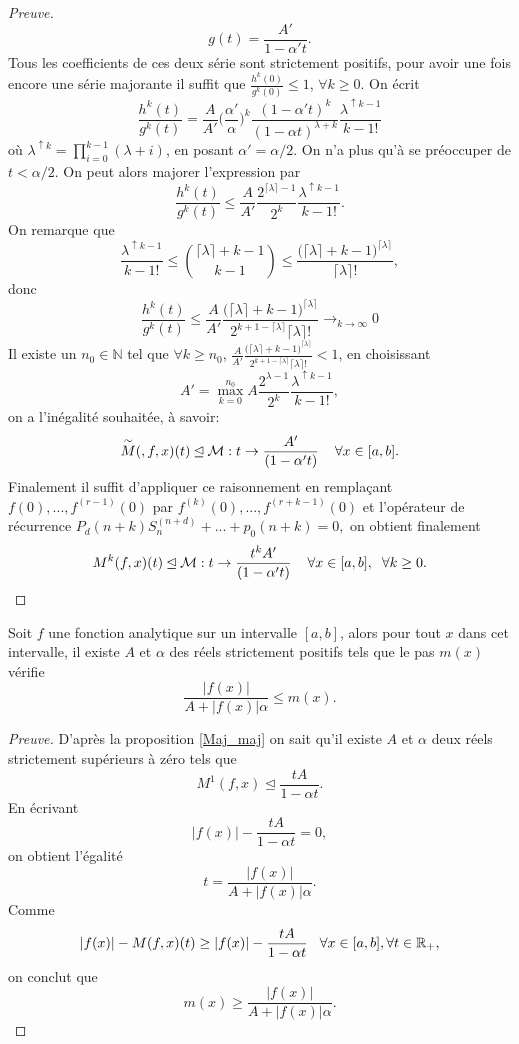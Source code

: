 \documentclass[a4paper,10pt]{article}
\begin{document}
\begin{proof}[Preuve]
		\[g(t)=\frac{A'}{1-\alpha' t}.\]
		Tous les coefficients de ces deux série sont strictement positifs, pour avoir une fois encore une série majorante il suffit que $\frac{h^{k}(0)}{g^k(0)}\leq 1$, $\forall k\geq0$. On écrit 
		\[\frac{h^{k}(t)}{g^k(t)}=\frac{A}{A'}\Big(\frac{\alpha'}{\alpha}\Big)^k\frac{(1-\alpha' t)^k}{(1-\alpha t)^{\lambda+k}}\frac{\lambda^{\uparrow k-1}}{k-1!}\]
		où $\lambda^{\uparrow k}=\prod_{i=0}^{k-1}(\lambda+i)$, en posant $\alpha'=\alpha/2$. On n'a plus qu'à se préoccuper de $t<\alpha/2$. On peut alors majorer l'expression par 
		\[\frac{h^{k}(t)}{g^k(t)}\leq \frac{A}{A'}\frac{2^{\lceil\lambda\rceil-1}}{2^k}\frac{\lambda^{\uparrow k-1}}{k-1!}.\] 
		On remarque que \[\frac{\lambda^{\uparrow k-1}}{k-1!}\leq \binom{\lceil \lambda \rceil +k-1}{k-1} \leq \frac{\big(\lceil \lambda \rceil +k-1\big)^{\lceil \lambda \rceil}}{\lceil \lambda \rceil!},\]
		donc
		\[\frac{h^{k}(t)}{g^k(t)}\leq \frac{A}{A'} \frac{\big(\lceil \lambda \rceil +k-1\big)^{\lceil \lambda \rceil}}{2^{k+1-\lceil \lambda \rceil}\lceil \lambda \rceil!} \rightarrow_{k \rightarrow \infty}0\]
		Il existe un $n_0 \in \mathbb{N}$ tel que $\forall k\geq n_0$, $\frac{A}{A'} \frac{\big(\lceil \lambda \rceil +k-1\big)^{\lceil \lambda \rceil}}{2^{k+1-\lceil \lambda \rceil}\lceil \lambda \rceil!}<1$, en choisissant 
		\[A'=\max_{k=0}^{n_0}A\frac{2^{\lambda-1}}{2^k}\frac{\lambda^{\uparrow k-1}}{k-1!},\]
		on a l'inégalité souhaitée, à savoir:
		\[\overset{\sim}{M}(,f,x)(t) \unlhd \mathcal{M}:t\rightarrow \frac{A'}{(1-\alpha' t)} \hspace{4mm} \forall x \in [a,b].\]
		Finalement il suffit d'appliquer ce raisonnement en remplaçant $f(0),...,f^{(r-1)}(0)$ par $f^{(k)}(0),...,f^{(r+k-1)}(0)$  et l'opérateur de récurrence 
		$P_d(n+k)S_n^{(n+d)}+...+p_0(n+k)=0,$ on obtient finalement
		\[M^k(f,x)(t) \unlhd \mathcal{M}:t\rightarrow\frac{t^kA'}{(1-\alpha' t)} \hspace{4mm} \forall x \in [a,b], \hspace{2mm} \forall k\geq0.\]
	\end{proof}
	
	\begin{proposition}
		Soit $f$ une fonction analytique sur un intervalle $[a,b]$, alors pour tout $x$ dans cet intervalle, il existe $A$ et $\alpha$ des réels strictement positifs tels que le pas $m(x)$ vérifie
		\[\frac{|f(x)|}{A+|f(x)|\alpha}\leq m(x).\]
		\label{minor}
	\end{proposition}
	
	\begin{proof}[Preuve]
		D'après la proposition \ref{Maj_maj} on sait qu'il existe $A$ et $\alpha$ deux réels strictement supérieurs à zéro tels que 
		\[M^1(f,x)\unlhd \frac{tA}{1-\alpha t}.\]
		En écrivant 
		\[|f(x)|-\frac{tA}{1-\alpha t}=0,\]
		on obtient l'égalité
		\[t=\frac{|f(x)|}{A+|f(x)|\alpha}.\]
		Comme 
		\[|f(x)|- M(f,x)(t)\geq |f(x)|-\frac{tA}{1-\alpha t} \hspace{3mm} \forall x \in [a,b], \forall t \in \mathbb{R}_+,\]
		on conclut que 
		\[m(x)\geq \frac{|f(x)|}{A+|f(x)|\alpha}.\]
	\end{proof}
	
\end{document}
